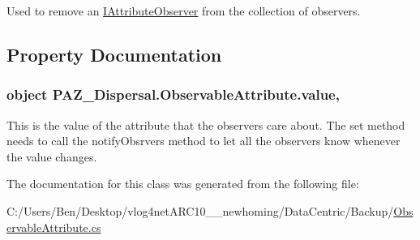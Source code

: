 Used to remove an \hyperlink{interface_p_a_z___dispersal_1_1_i_attribute_observer}{I\-Attribute\-Observer} from the collection of observers. 



\subsection{Property Documentation}
\hypertarget{class_p_a_z___dispersal_1_1_observable_attribute_aa17717793a294b39a576a598d4a72431}{
\subsubsection[{value}]{\setlength{\rightskip}{0pt plus 5cm}object P\-A\-Z\-\_\-\-Dispersal.\-Observable\-Attribute.\-value\hspace{0.3cm}{\ttfamily [get]}, {\ttfamily [set]}}}\label{class_p_a_z___dispersal_1_1_observable_attribute_aa17717793a294b39a576a598d4a72431}


This is the value of the attribute that the observers care about. The set method needs to call the notify\-Obsrvers method to let all the observers know whenever the value changes. 



The documentation for this class was generated from the following file\-:\begin{DoxyCompactItemize}
\item 
C\-:/\-Users/\-Ben/\-Desktop/vlog4net\-A\-R\-C10\-\_\-\_\-newhoming/\-Data\-Centric/\-Backup/\hyperlink{_backup_2_observable_attribute_8cs}{Observable\-Attribute.\-cs}\end{DoxyCompactItemize}
